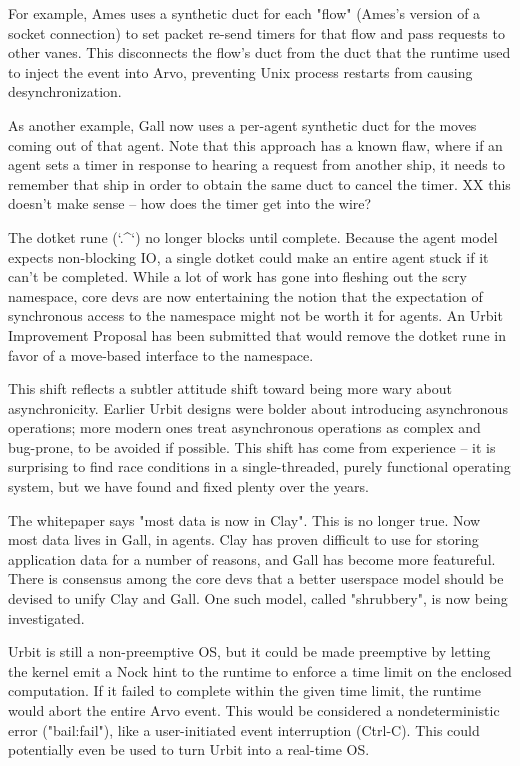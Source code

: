\documentclass[twoside]{article}
\begin{document}
For example, Ames uses a synthetic duct for each "flow" (Ames's version of a socket connection) to set packet re-send timers for that flow and pass requests to other vanes.  This disconnects the flow's duct from the duct that the runtime used to inject the event into Arvo, preventing Unix process restarts from causing desynchronization.

As another example, Gall now uses a per-agent synthetic duct for the moves coming out of that agent.  Note that this approach has a known flaw, where if an agent sets a timer in response to hearing a request from another ship, it needs to remember that ship in order to obtain the same duct to cancel the timer.  XX this doesn't make sense – how does the timer get into the wire?

The dotket rune (`.^`) no longer blocks until complete.  Because the agent model expects non-blocking IO, a single dotket could make an entire agent stuck if it can't be completed.  While a lot of work has gone into fleshing out the scry namespace, core devs are now entertaining the notion that the expectation of synchronous access to the namespace might not be worth it for agents.  An Urbit Improvement Proposal has been submitted that would remove the dotket rune in favor of a move-based interface to the namespace.

This shift reflects a subtler attitude shift toward being more wary about asynchronicity.  Earlier Urbit designs were bolder about introducing asynchronous operations; more modern ones treat asynchronous operations as complex and bug-prone, to be avoided if possible.  This shift has come from experience – it is surprising to find race conditions in a single-threaded, purely functional operating system, but we have found and fixed plenty over the years.  

The whitepaper says "most data is now in Clay".  This is no longer true.  Now most data lives in Gall, in agents.  Clay has proven difficult to use for storing application data for a number of reasons, and Gall has become more featureful.  There is consensus among the core devs that a better userspace model should be devised to unify Clay and Gall.  One such model, called "shrubbery", is now being investigated.

Urbit is still a non-preemptive OS, but it could be made preemptive by letting the kernel emit a Nock hint to the runtime to enforce a time limit on the enclosed computation.  If it failed to complete within the given time limit, the runtime would abort the entire Arvo event.  This would be considered a nondeterministic error ("bail:fail"), like a user-initiated event interruption (Ctrl-C).  This could potentially even be used to turn Urbit into a real-time OS.
\end{document}
